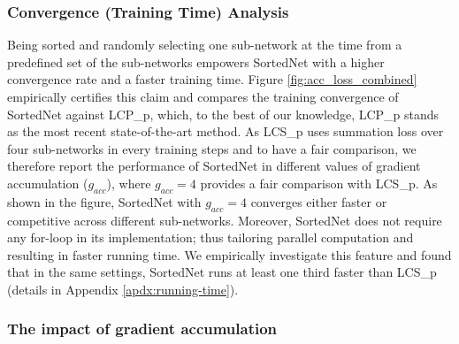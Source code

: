 \documentclass[letterpaper]{article} %
\begin{document}
\subsubsection{Convergence (Training Time) Analysis}
\label{convergence-time}
Being sorted and randomly selecting one sub-network at the time from a predefined set of the sub-networks empowers SortedNet with a higher convergence rate and a faster training time. Figure \ref{fig:acc_loss_combined} empirically certifies this claim and compares the training convergence of SortedNet against LCP\_p, which, to the best of our knowledge, LCP\_p stands as the most recent state-of-the-art method. As LCS\_p uses summation loss over four sub-networks in every training steps and to have a fair comparison, we therefore report the performance of SortedNet in different values of gradient accumulation ($g_{acc}$), where $g_{acc}=4$ provides a fair comparison with LCS\_p. As shown in the figure, SortedNet with $g_{acc}=4$ converges either faster or competitive across different sub-networks. Moreover, SortedNet does not require any for-loop in its implementation; thus tailoring parallel computation and resulting in faster running time. We empirically investigate this feature and found that in the same settings, SortedNet runs  at least one third faster than LCS\_p (details in Appendix \ref{apdx:running-time}).


\subsubsection{The impact of gradient accumulation}
 
\end{document}
